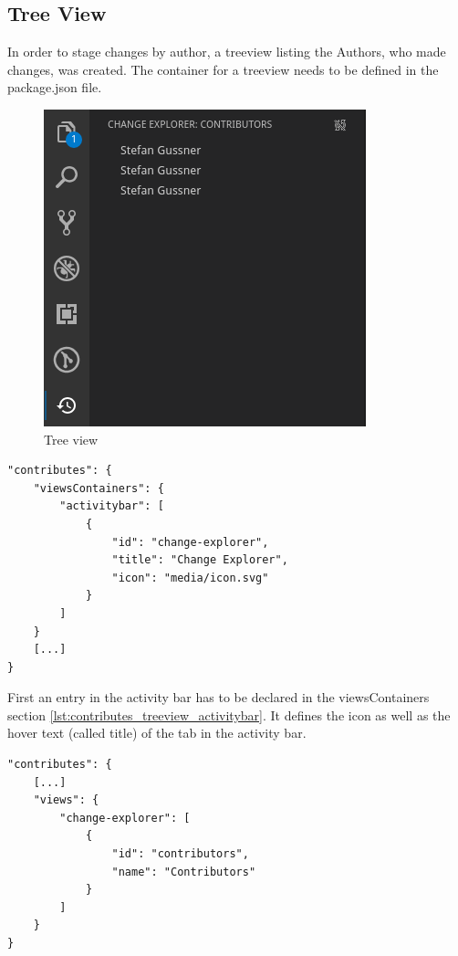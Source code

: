 \subsection{Tree View}

In order to stage changes by author, a treeview listing the Authors, who made changes, was created.
The container for a treeview needs to be defined in the package.json file. 

\begin{figure}[]
    \centering
    \includegraphics{figures/screenshots/treeview.png}
    \caption{Tree view}
    \label{fig:treeview}
\end{figure}

\begin{lstlisting}[label={lst:contributes_treeview_activitybar}]
"contributes": {
    "viewsContainers": {
        "activitybar": [
            {
                "id": "change-explorer",
                "title": "Change Explorer",
                "icon": "media/icon.svg"
            }
        ]
    }
    [...]
}
\end{lstlisting}

First an entry in the activity bar has to be declared in the viewsContainers section \ref{lst:contributes_treeview_activitybar}. It defines the icon as well as the hover text (called title) of the tab in the activity bar.

\begin{lstlisting}[label={lst:contributes_treeview_view}]
"contributes": {
    [...]
    "views": {
        "change-explorer": [
            {
                "id": "contributors",
                "name": "Contributors"
            }
        ]
    }
}
\end{lstlisting}

